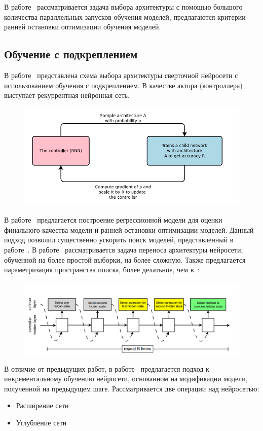 \documentclass{article}
\begin{document}
В работе~\cite{optimal_racing} рассматривается задача выбора архитектуры с помощью большого количества параллельных запусков обучения моделей, предлагаются критерии ранней остановки оптимизации обучения моделей.


\subsection{ Обучение с подкреплением}
В работе~\cite{reinf} представлена схема выбора архитектуры сверточной нейросети с использованием обучения с подкреплением. В качестве актора (контроллера) выступает рекуррентная нейронная сеть.
\begin{figure}[H]
\includegraphics[width=\textwidth]{./arch_review_figs/reinf.png}
\end{figure}
В работе~\cite{reinf_predict} предлагается построение регрессионной модели для оценки финального качества модели и ранней остановки оптимизации моделей. Данный подход позволил существенно ускорить поиск моделей, представленный в работе~\cite{reinf}.
В работе~\cite{reinf_transfer} рассматривается задача переноса архитектуры нейросети, обученной на более простой выборки, на более сложную. Также предлагается параметризация пространства поиска, более делатьное, чем в~\cite{reinf}:
\begin{figure}[H]
\includegraphics[width=\textwidth]{./arch_review_figs/reinf2.png}
\end{figure}

В отличие от предыдущих работ, в работе~\cite{reinf_deep2net} предлагается подход к инкрементальному обучению нейросети, основанном на модификации модели, полученной на предыдущем шаге. Рассматривается две операции над нейросетью:
\begin{itemize}
\item Расширение сети
\item Углубление сети
\end{itemize}
\end{document}
